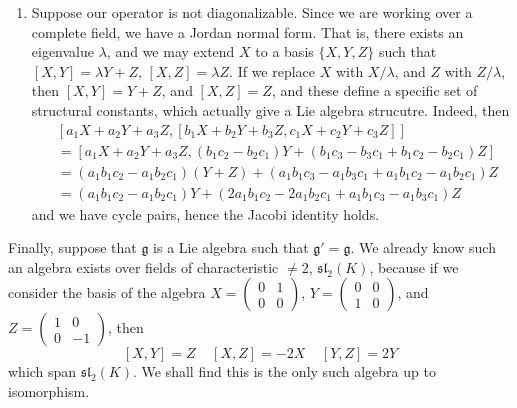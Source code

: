 \begin{enumerate}
    \item Suppose our operator is not diagonalizable. Since we are working over a complete field, we have a Jordan normal form. That is, there exists an eigenvalue $\lambda$, and we may extend $X$ to a basis $\{ X,Y,Z \}$ such that $[X,Y] = \lambda Y + Z$, $[X,Z] = \lambda Z$. If we replace $X$ with $X/\lambda$, and $Z$ with $Z/\lambda$, then $[X,Y] = Y + Z$, and $[X,Z] = Z$, and these define a specific set of structural constants, which actually give a Lie algebra strucutre. Indeed, then
    \begin{align*}
        &[a_1X + a_2Y + a_3Z, [b_1X + b_2Y + b_3Z, c_1X + c_2Y + c_3Z]]\\
        &= [a_1X + a_2Y + a_3Z, (b_1c_2 - b_2c_1) Y + (b_1c_3 - b_3c_1 + b_1c_2 - b_2c_1) Z]\\
        &= (a_1b_1c_2 - a_1 b_2c_1) (Y + Z) + (a_1 b_1c_3 - a_1 b_3 c_1 + a_1b_1c_2 - a_1b_2c_1) Z\\
        &= (a_1b_1c_2 - a_1b_2c_1) Y + (2a_1b_1c_2 - 2a_1b_2c_1 + a_1b_1c_3 - a_1b_3c_1) Z
    \end{align*}
    and we have cycle pairs, hence the Jacobi identity holds.
\end{enumerate}

Finally, suppose that $\mathfrak{g}$ is a Lie algebra such that $\mathfrak{g}' = \mathfrak{g}$. We already know such an algebra exists over fields of characteristic $\neq 2$, $\mathfrak{sl}_2(K)$, because if we consider the basis of the algebra $X = \left( \begin{smallmatrix} 0 & 1 \\ 0 & 0 \end{smallmatrix} \right)$, $Y = \left( \begin{smallmatrix} 0 & 0 \\ 1 & 0 \end{smallmatrix} \right)$, and $Z = \left( \begin{smallmatrix} 1 & 0 \\ 0 & -1 \end{smallmatrix} \right)$, then
%
\[ [X,Y] = Z\ \ \ \ \ [X,Z] = -2X\ \ \ \ \ [Y,Z] = 2Y \]
%
which span $\mathfrak{sl}_2(K)$. We shall find this is the only such algebra up to isomorphism.


